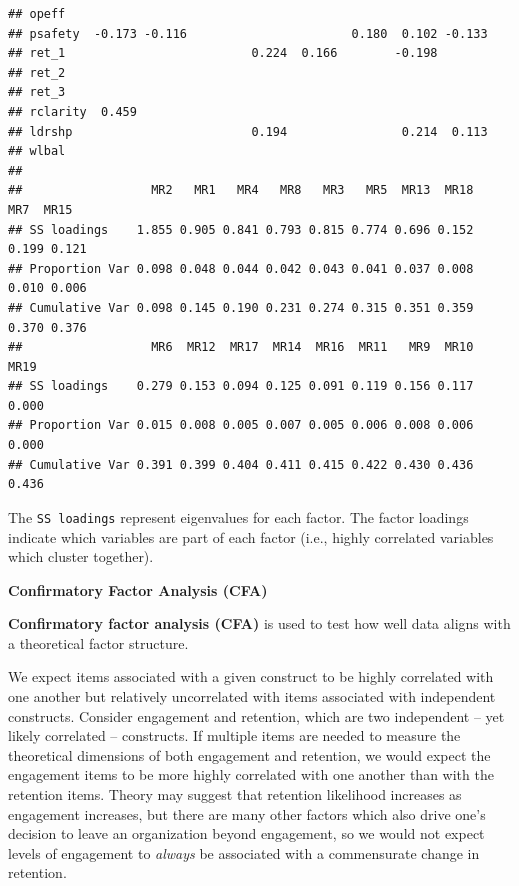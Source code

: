 \documentclass[
]{book}
\begin{document}
\begin{verbatim}
## opeff                                                                  
## psafety  -0.173 -0.116                       0.180  0.102 -0.133       
## ret_1                          0.224  0.166        -0.198              
## ret_2                                                                  
## ret_3                                                                  
## rclarity  0.459                                                        
## ldrshp                         0.194                0.214  0.113       
## wlbal                                                                  
## 
##                  MR2   MR1   MR4   MR8   MR3   MR5  MR13  MR18   MR7  MR15
## SS loadings    1.855 0.905 0.841 0.793 0.815 0.774 0.696 0.152 0.199 0.121
## Proportion Var 0.098 0.048 0.044 0.042 0.043 0.041 0.037 0.008 0.010 0.006
## Cumulative Var 0.098 0.145 0.190 0.231 0.274 0.315 0.351 0.359 0.370 0.376
##                  MR6  MR12  MR17  MR14  MR16  MR11   MR9  MR10  MR19
## SS loadings    0.279 0.153 0.094 0.125 0.091 0.119 0.156 0.117 0.000
## Proportion Var 0.015 0.008 0.005 0.007 0.005 0.006 0.008 0.006 0.000
## Cumulative Var 0.391 0.399 0.404 0.411 0.415 0.422 0.430 0.436 0.436
\end{verbatim}

The \texttt{SS\ loadings} represent eigenvalues for each factor. The factor loadings indicate which variables are part of each factor (i.e., highly correlated variables which cluster together).

\textbf{Confirmatory Factor Analysis (CFA)}

\textbf{Confirmatory factor analysis (CFA)} is used to test how well data aligns with a theoretical factor structure.

We expect items associated with a given construct to be highly correlated with one another but relatively uncorrelated with items associated with independent constructs. Consider engagement and retention, which are two independent -- yet likely correlated -- constructs. If multiple items are needed to measure the theoretical dimensions of both engagement and retention, we would expect the engagement items to be more highly correlated with one another than with the retention items. Theory may suggest that retention likelihood increases as engagement increases, but there are many other factors which also drive one's decision to leave an organization beyond engagement, so we would not expect levels of engagement to \emph{always} be associated with a commensurate change in retention.
\end{document}
